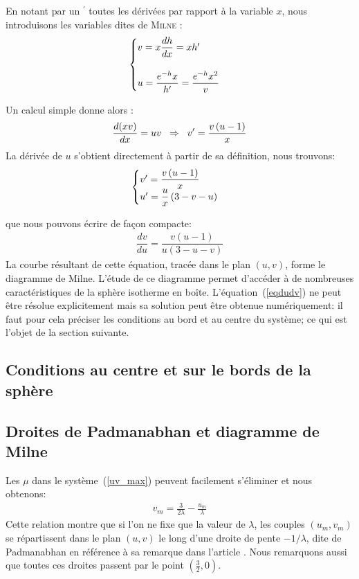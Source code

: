 		En notant par un $^\prime$ toutes les dérivées par rapport à la variable $x$, nous introduisons les variables dites de \textsc{Milne :}
		\begin{align}
			\begin{cases}
			v = x \dfrac{d h}{dx} = x h' \\
			\\
			u = \dfrac{e^{-h} x}{h'} = \dfrac{e^{-h} x^2}{v}
		\end{cases}\label{syst_uv}
		\end{align}
		
Un calcul simple donne alors :
\begin{align}
	\dfrac{d(xv)}{dx} = uv \;\;\Rightarrow\;\; v' = \frac{v \left( u - 1\right)}{x} \notag
\end{align}
La dérivée de $u$ s'obtient directement à partir de sa définition, nous trouvons:
	$$\begin{cases}
		v' = \dfrac{v \left( u - 1\right)}{x} \\
		u' = \dfrac{u}{x}\left(3 - v - u\right)
	\end{cases} \label{systdudv}$$
	
	que nous pouvons écrire de façon compacte:
	\begin{align}
		\dfrac{d v}{d u} = \dfrac{v \left( u - 1\right)}{u \left(3 - u - v\right)}
		\label{eqdudv}
	\end{align}
	La courbe résultant de cette équation, tracée dans le plan $\left(u, v\right)$, forme le diagramme
	de Milne. L'étude de ce diagramme permet d'accéder à de nombreuses caractéristiques de la sphère isotherme en
	boîte. L'équation~(\ref{eqdudv}) ne peut être résolue explicitement mais sa solution peut être obtenue
	numériquement: il faut pour cela préciser les conditions au bord et au centre du système; ce qui est l'objet de la
	section suivante.
	

\subsection{Conditions au centre et sur le bords de la sphère}
	

\subsection{Droites de Padmanabhan et diagramme de Milne}
	Les $\mu$ dans le système~(\ref{uv_max}) peuvent facilement s'éliminer et nous obtenons:
	\begin{align}
		v_m = \frac{3}{2\lambda} - \frac{u_m}{\lambda}\label{droitePb}
	\end{align}
	Cette relation montre que si l'on ne fixe que la valeur de $\lambda$,  les couples $(u_m,v_m)$  se répartissent
	dans le plan $(u,v)$ le long d'une droite de pente $-1/\lambda$, dite de Padmanabhan en référence à sa remarque
	dans l'article \cite{1989ApJS...71..651P}. Nous remarquons aussi que toutes ces droites passent par le point
	$(\frac{3}{2},0)$.
	
